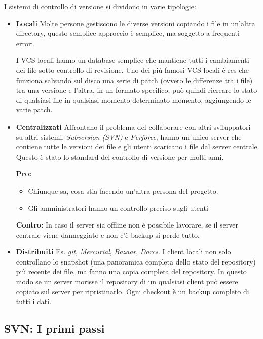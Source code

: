 I sistemi di controllo di versione si dividono in varie tipologie: 
\begin{itemize}
\item \textbf{Locali} Molte persone gestiscono le diverse versioni copiando i file in un'altra directory, questo semplice approccio è semplice, ma soggetto a frequenti errori. 

I VCS locali hanno un database semplice che mantiene tutti i cambiamenti dei file sotto controllo di revisione. Uno dei più famosi VCS locali è rcs che  funziona salvando sul disco una serie di patch (ovvero le differenze tra i file) tra una versione e l'altra, in un formato specifico; può quindi ricreare lo stato di qualsiasi file in qualsiasi momento determinato momento, aggiungendo le varie patch.

\item \textbf{Centralizzati} Affrontano il problema del collaborare con altri sviluppatori su altri sistemi. \textit{Subversion (SVN)} e \textit{Perforce}, hanno un unico server che contiene tutte le versioni dei file e gli utenti scaricano i file dal server centrale. Questo è stato lo standard del controllo di versione per molti anni.

\textbf{Pro:} 
\begin{itemize}
\item Chiunque sa, cosa stia facendo un'altra persona del progetto. \item Gli amministratori hanno un controllo preciso sugli utenti
\end{itemize}

\textbf{Contro:} 
In caso il server sia offline non è possibile lavorare, se il server centrale viene danneggiato e non c'è backup si perde tutto.

\item \textbf{Distribuiti} Es. \textit{git}, \textit{Mercurial}, \textit{Bazaar}, \textit{Darcs}. I client locali non solo controllano lo snapshot (una panoramica completa dello stato del repository) più recente dei file, ma fanno una copia completa del repository. In questo modo se un server morisse il repository di un qualsiasi client può essere copiato sul server per ripristinarlo. Ogni checkout è un backup completo di tutti i dati.
\end{itemize}

\subsection{SVN: I primi passi}
